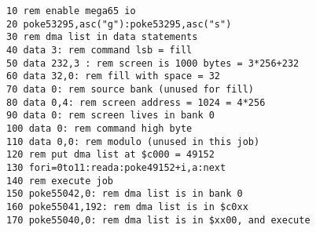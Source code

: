 \begin{tcolorbox}[colback=black,coltext=white]
\verbatimfont{\codefont}
\begin{verbatim}
10 rem enable mega65 io
20 poke53295,asc("g"):poke53295,asc("s")
30 rem dma list in data statements
40 data 3: rem command lsb = fill
50 data 232,3 : rem screen is 1000 bytes = 3*256+232
60 data 32,0: rem fill with space = 32
70 data 0: rem source bank (unused for fill)
80 data 0,4: rem screen address = 1024 = 4*256
90 data 0: rem screen lives in bank 0
100 data 0: rem command high byte
110 data 0,0: rem modulo (unused in this job)
120 rem put dma list at $c000 = 49152
130 fori=0to11:reada:poke49152+i,a:next
140 rem execute job
150 poke55042,0: rem dma list is in bank 0
160 poke55041,192: rem dma list is in $c0xx
170 poke55040,0: rem dma list is in $xx00, and execute
\end{verbatim}
\end{tcolorbox}
